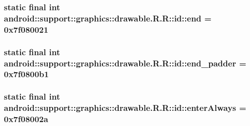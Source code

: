 \hypertarget{classandroid_1_1support_1_1graphics_1_1drawable_1_1_r_1_1id_e503a324afa7e91460b95e1c56627296}{
\subsubsection[{end}]{\setlength{\rightskip}{0pt plus 5cm}static final int android::support::graphics::drawable.R.R::id::end = 0x7f080021}}
\label{classandroid_1_1support_1_1graphics_1_1drawable_1_1_r_1_1id_e503a324afa7e91460b95e1c56627296}


\hypertarget{classandroid_1_1support_1_1graphics_1_1drawable_1_1_r_1_1id_110f381da2cf7075f780e6154120d467}{
\subsubsection[{end\_\-padder}]{\setlength{\rightskip}{0pt plus 5cm}static final int android::support::graphics::drawable.R.R::id::end\_\-padder = 0x7f0800b1}}
\label{classandroid_1_1support_1_1graphics_1_1drawable_1_1_r_1_1id_110f381da2cf7075f780e6154120d467}


\hypertarget{classandroid_1_1support_1_1graphics_1_1drawable_1_1_r_1_1id_5190a188d93cb1aaf594686342b500cb}{
\subsubsection[{enterAlways}]{\setlength{\rightskip}{0pt plus 5cm}static final int android::support::graphics::drawable.R.R::id::enterAlways = 0x7f08002a}}
\label{classandroid_1_1support_1_1graphics_1_1drawable_1_1_r_1_1id_5190a188d93cb1aaf594686342b500cb}


